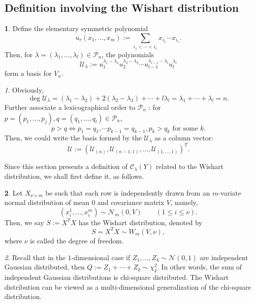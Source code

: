 \documentclass[10pt,oneside,american]{amsart}
\numberwithin{equation}{section}
\numberwithin{figure}{section}
\theoremstyle{definition}
\newtheorem{defn}{\protect\definitionname}[section]
\theoremstyle{remark}
\newtheorem{rem}{\protect\remarkname}[section]
\theoremstyle{plain}
\theoremstyle{definition}
\theoremstyle{plain}
\providecommand{\definitionname}{Definition}
\providecommand{\remarkname}{Remark}
\begin{document}
\subsection{Definition involving the Wishart distribution}
\begin{defn}
Define the elementary symmetric polynomial \cite[pp.~12, eq.~9]{Takemura}
\[
u_{r}(x_{1},\ldots,x_{m}):=\underset{i_{1}<\cdots<i_{r}}{\sum}x_{i_{1}}\cdots x_{i_{r}}.
\]
Then, for $\lambda=\left(\lambda_{1},\ldots,\lambda_{l}\right)\in\mathcal{P}_{n}$,
the polynomials \cite[pp.~12, eq.~10]{Takemura}
\[
\mathcal{U}_{\lambda}:=u_{1}^{\lambda_{1}-\lambda_{2}}u_{2}^{\lambda_{2}-\lambda_{3}}\cdots u_{l-1}^{\lambda_{l-1}-\lambda_{l}}u_{l}^{\lambda_{l}}
\]
\cite[pp.~13]{Takemura} form a basis for $V_{n}$.
\end{defn}
\begin{rem}
Obviously, 
\[
\deg\mathcal{U}_{\lambda}=\left(\lambda_{1}-\lambda_{2}\right)+2\left(\lambda_{2}-\lambda_{3}\right)+\cdots+l\lambda_{l}=\lambda_{1}+\cdots+\lambda_{l}=n.
\]
Further associate a lexicographical order to $\mathcal{P}_{n}$ \cite[pp.~9, eq.~7]{Takemura}:
for $p=\left(p_{1},\ldots,p_{j}\right),q=\left(q_{1},\ldots,q_{l}\right)\in\mathcal{P}_{n}$,
\[
p>q\Leftrightarrow p_{1}=q_{1},\cdots p_{k-1}=q_{k-1},p_{k}>q_{k}\text{ for some }k.
\]
Then, we could write the basis formed by the $\mathcal{U}_{\lambda}$
as a column vector:
\[
\mathcal{U}:=\left(\mathcal{U}_{\left(n\right)},\mathcal{U}_{\left(n-1,1\right)},\ldots,\mathcal{U}_{\left(1,\ldots,1\right)}\right)^{T}.
\]
\end{rem}
Since this section presents a definition of $\mathcal{C}_{\lambda}(Y)$
related to the Wishart distribution, we shall first define it, as follows.
\begin{defn}
Let $X_{\nu\times m}$ be such that each row is independently drawn
from an $m$-variate normal distribution of mean $0$ and covariance
matrix $V$, namely, 
\[
  \left(x_{i}^{1},\ldots,x_{i}^{m}\right)\sim\mathcal{N}_{m}(0,V)
  \qquad (1\leq i\leq\nu).
\]
Then, we say $S:=X^{T}X$ has the Wishart distribution, denoted by
\[
S=X^{T}X\sim W_{m}(V,\nu),
\]
where $\nu$ is called the degree of freedom.
\end{defn}
\begin{rem}
Recall that in the $1$-dimensional case if $Z_{1},\ldots,Z_{k}\sim\mathcal{N}(0,1)$
are independent Gaussian distributed, then $Q:=Z_{1}+\cdots+Z_{k}\sim\chi_{k}^{2}$.
In other words, the sum of independent Gaussian distributions is chi-square
distributed. The Wishart distribution can be viewed as a multi-dimensional
generalization of the chi-square distribution.
\end{rem}
\end{document}
